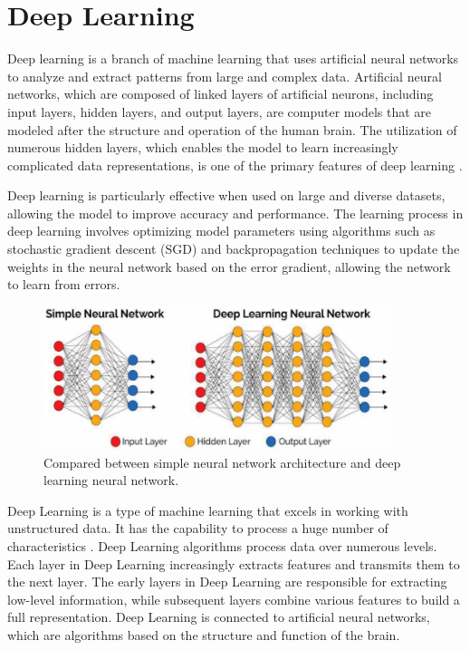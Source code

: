 \section{Deep Learning}
\label{sec2:DeepLearning}

Deep learning is a branch of machine learning that uses artificial neural networks to analyze and extract patterns from large and complex data. Artificial neural networks, which are composed of linked layers of artificial neurons, including input layers, hidden layers, and output layers, are computer models that are modeled after the structure and operation of the human brain. The utilization of numerous hidden layers, which enables the model to learn increasingly complicated data representations, is one of the primary features of deep learning \cite{DL3}.

Deep learning is particularly effective when used on large and diverse datasets, allowing the model to improve accuracy and performance. The learning process in deep learning involves optimizing model parameters using algorithms such as stochastic gradient descent (SGD) and backpropagation techniques to update the weights in the neural network based on the error gradient, allowing the network to learn from errors.

\begin{figure}[H]
    \centering
    \includegraphics[width=0.9\textwidth]{bab2/ar_DLArchitecture.png}
    \caption{Compared between simple neural network architecture and deep learning neural network.}
    \label{fig:DLArchitecture}
\end{figure}

Deep Learning is a type of machine learning that excels in working with unstructured data. It has the capability to process a huge number of characteristics \cite{DL1}. Deep Learning algorithms process data over numerous levels. Each layer in Deep Learning increasingly extracts features and transmits them to the next layer. The early layers in Deep Learning are responsible for extracting low-level information, while subsequent layers combine various features to build a full representation. Deep Learning is connected to artificial neural networks, which are algorithms based on the structure and function of the brain.


